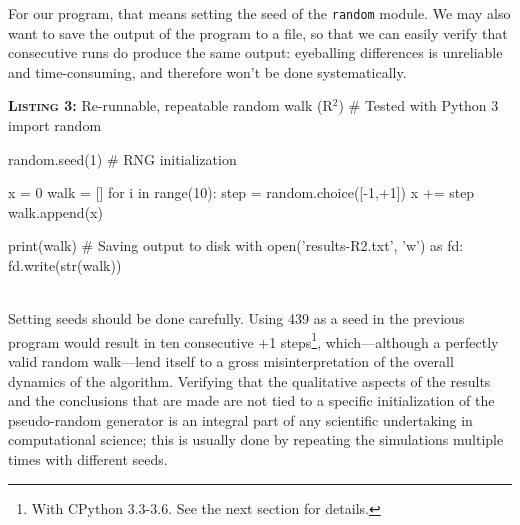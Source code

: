 \documentclass[a4paper,11pt]{article}
\begin{document}
For our program, that means setting the seed of the {\tt random} module. We may also want to save the output of the program to a file, so that we can easily verify that consecutive runs do produce the same output: eyeballing differences is unreliable and  time-consuming, and therefore won't be done systematically.\\

\noindent \begin{minipage}[c]{\linewidth}
\begin{code}{\textbf{\textsc{Listing 3:}} Re-runnable, repeatable random walk (R$^2$)}
# Tested with Python 3
import random

random.seed(1) # RNG initialization

x =  0
walk = []
for i in range(10):
    step = random.choice([-1,+1])
    x += step
    walk.append(x)

print(walk)
# Saving output to disk
with open('results-R2.txt', 'w') as fd:
    fd.write(str(walk))
\end{code}
\end{minipage}\\

Setting seeds should be done carefully. Using 439 as a seed in the previous program would result in ten consecutive +1 steps\footnote{With CPython 3.3-3.6. See the next section for details.}, which---although a perfectly valid random walk---lend itself to a gross misinterpretation of the overall dynamics of the algorithm. Verifying that the qualitative aspects of the results and the conclusions that are made are not tied to a specific initialization of the pseudo-random generator is an integral part of any scientific undertaking in computational science;
this is usually done by repeating the simulations multiple times with different seeds.

\end{document}
